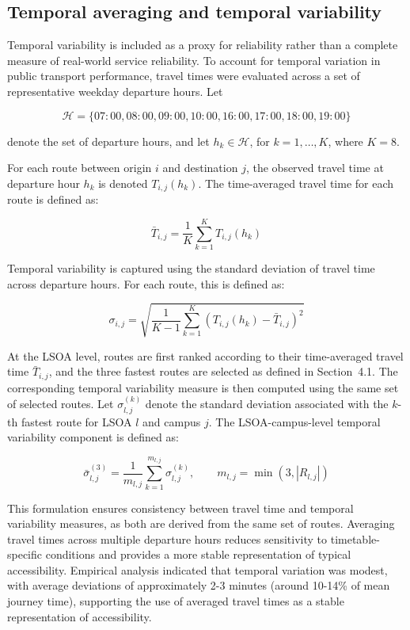 \documentclass[11pt,a4paper]{article}
\begin{document}
\subsection{Temporal averaging and temporal variability}

Temporal variability is included as a proxy for reliability rather than a complete measure of real-world service reliability. To account for temporal variation in public transport performance, travel times were evaluated across a set of representative weekday departure hours. Let

\[
\mathcal{H} = \{07{:}00,08{:}00,09{:}00,10{:}00,16{:}00,17{:}00,18{:}00,19{:}00\}
\]

denote the set of departure hours, and let \(h_k \in \mathcal{H}\), for \(k = 1,\ldots,K\), where \(K = 8\).

For each route between origin \(i\) and destination \(j\), the observed travel time at departure hour \(h_k\) is denoted \(T_{i,j}(h_k)\). The time-averaged travel time for each route is defined as:

\[
\bar{T}_{i,j} = \frac{1}{K} \sum_{k=1}^{K} T_{i,j}(h_k)
\]

Temporal variability is captured using the standard deviation of travel time across departure hours. For each route, this is defined as:

\[
\sigma_{i,j} =
\sqrt{
\frac{1}{K-1}
\sum_{k=1}^{K}
\left(T_{i,j}(h_k) - \bar{T}_{i,j}\right)^2
}
\]

At the LSOA level, routes are first ranked according to their time-averaged travel time \(\bar{T}_{i,j}\), and the three fastest routes are selected as defined in Section~4.1. The corresponding temporal variability measure is then computed using the same set of selected routes. Let \(\sigma_{l,j}^{(k)}\) denote the standard deviation associated with the \(k\)-th fastest route for LSOA \(l\) and campus \(j\). The LSOA-campus-level temporal variability component is defined as:

\[
\bar{\sigma}_{l,j}^{(3)}
=
\frac{1}{m_{l,j}}
\sum_{k=1}^{m_{l,j}}
\sigma_{l,j}^{(k)},
\qquad
m_{l,j} = \min(3, |R_{l,j}|)
\]

This formulation ensures consistency between travel time and temporal variability measures, as both are derived from the same set of routes. Averaging travel times across multiple departure hours reduces sensitivity to timetable-specific conditions and provides a more stable representation of typical accessibility. Empirical analysis indicated that temporal variation was modest, with average deviations of approximately 2-3 minutes (around 10-14\% of mean journey time), supporting the use of averaged travel times as a stable representation of accessibility.
\end{document}
